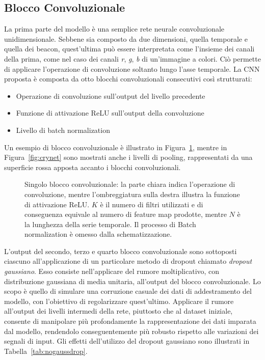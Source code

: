 \subsection{Blocco Convoluzionale}
La prima parte del modello è una semplice rete neurale convoluzionale
unidimensionale. Sebbene sia composto da due dimensioni, quella temporale e
quella dei beacon, quest'ultima può essere interpretata come l'insieme dei
canali della prima, come nel caso dei canali \emph{r}, \emph{g}, \emph{b} di
un'immagine a colori. Ciò permette di applicare l'operazione di convoluzione
soltanto lungo l'asse temporale.
La CNN proposta è composta da otto blocchi convoluzionali consecutivi così
strutturati:
\begin{itemize}
    \item Operazione di convoluzione sull'output del livello precedente
    \item Funzione di attivazione ReLU sull'output della convoluzione
    \item Livello di batch normalization
\end{itemize}
Un esempio di blocco convoluzionale è illustrato in Figura~\ref{fig:cnnblock},
mentre in Figura~\ref{fig:crynet} sono mostrati anche i livelli di pooling,
rappresentati da una superficie rossa apposta accanto i blocchi convoluzionali.
\begin{figure}
  \caption{Singolo blocco convoluzionale: la parte chiara indica l'operazione
    di convoluzione, mentre l'ombreggiatura sulla destra illustra la funzione
    di attivazione ReLU. \(K\) è il numero di filtri utilizzati e di
    conseguenza equivale al numero di feature map prodotte, mentre \(N\) è la
    lunghezza della serie temporale. Il processo di Batch normalization è
    omesso dalla schematizzazione.}%
  \label{fig:cnnblock}%
\end{figure}

L'output del secondo, terzo e quarto blocco convoluzionale sono sottoposti
ciascuno all'applicazione di un particolare metodo di dropout chiamato
\emph{dropout gaussiano}. Esso consiste nell'applicare del rumore
moltiplicativo, con distribuzione gaussiana di media unitaria, all'output del
blocco convoluzionale. Lo scopo è quello di simulare una corruzione casuale dei
dati di addestramento del modello, con l'obiettivo di regolarizzare
quest'ultimo. Applicare il rumore all'output dei livelli intermedi della rete,
piuttosto che al dataset iniziale, consente di manipolare più profondamente la
rappresentazione dei dati imparata dal modello, rendendolo conseguentemente più
robusto rispetto alle variazioni dei segnali di
input\cite{noise-hidden-layers}. Gli effetti dell'utilizzo del dropout
gaussiano sono illustrati in Tabella~\ref{tab:nogaussdrop}.


